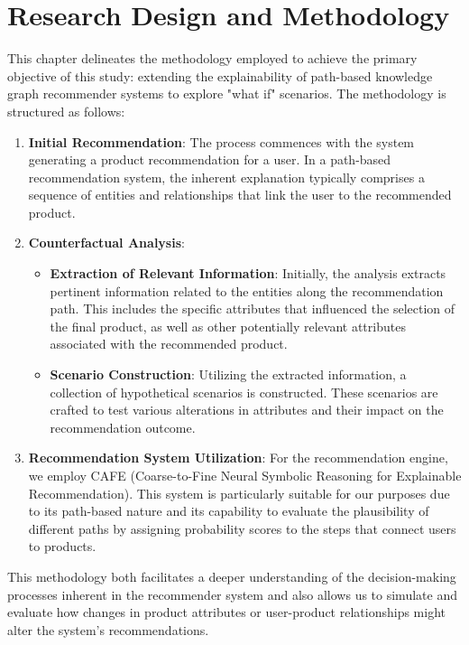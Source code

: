 \chapter{Research Design and Methodology}
\label{chap:methodology} This chapter delineates the methodology employed to achieve
the primary objective of this study: extending the explainability of path-based
knowledge graph recommender systems to explore "what if" scenarios. The methodology
is structured as follows:
\begin{enumerate}
	\item \textbf{Initial Recommendation}: The process commences with the system generating
		a product recommendation for a user. In a path-based recommendation system, the
		inherent explanation typically comprises a sequence of entities and relationships
		that link the user to the recommended product.

	\item \textbf{Counterfactual Analysis}:
		\begin{itemize}
			\item \textbf{Extraction of Relevant Information}: Initially, the analysis
				extracts pertinent information related to the entities along the
				recommendation path. This includes the specific attributes that influenced
				the selection of the final product, as well as other potentially
				relevant attributes associated with the recommended product.

			\item \textbf{Scenario Construction}: Utilizing the extracted information,
				a collection of hypothetical scenarios is constructed. These scenarios are
				crafted to test various alterations in attributes and their impact on the
				recommendation outcome.
		\end{itemize}

	\item \textbf{Recommendation System Utilization}: For the recommendation engine,
		we employ CAFE (Coarse-to-Fine Neural Symbolic Reasoning for Explainable Recommendation).
		This system is particularly suitable for our purposes due to its path-based nature
		and its capability to evaluate the plausibility of different paths by assigning
		probability scores to the steps that connect users to products.
\end{enumerate}

This methodology both facilitates a deeper understanding of the decision-making processes
inherent in the recommender system and also allows us to simulate and evaluate how
changes in product attributes or user-product relationships might alter the system's
recommendations.

